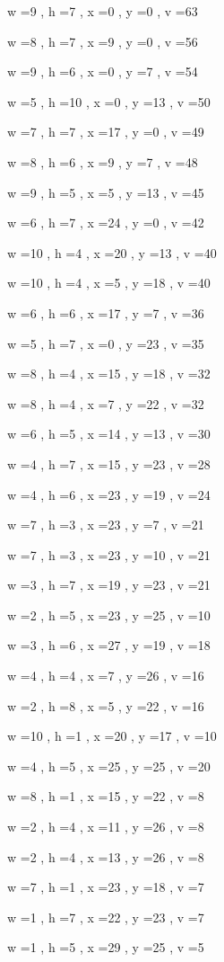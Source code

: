\documentclass[11pt]{article}
\begin{document}
w =9 , h =7 , x =0 , y =0 , v =63
\par
w =8 , h =7 , x =9 , y =0 , v =56
\par
w =9 , h =6 , x =0 , y =7 , v =54
\par
w =5 , h =10 , x =0 , y =13 , v =50
\par
w =7 , h =7 , x =17 , y =0 , v =49
\par
w =8 , h =6 , x =9 , y =7 , v =48
\par
w =9 , h =5 , x =5 , y =13 , v =45
\par
w =6 , h =7 , x =24 , y =0 , v =42
\par
w =10 , h =4 , x =20 , y =13 , v =40
\par
w =10 , h =4 , x =5 , y =18 , v =40
\par
w =6 , h =6 , x =17 , y =7 , v =36
\par
w =5 , h =7 , x =0 , y =23 , v =35
\par
w =8 , h =4 , x =15 , y =18 , v =32
\par
w =8 , h =4 , x =7 , y =22 , v =32
\par
w =6 , h =5 , x =14 , y =13 , v =30
\par
w =4 , h =7 , x =15 , y =23 , v =28
\par
w =4 , h =6 , x =23 , y =19 , v =24
\par
w =7 , h =3 , x =23 , y =7 , v =21
\par
w =7 , h =3 , x =23 , y =10 , v =21
\par
w =3 , h =7 , x =19 , y =23 , v =21
\par
w =2 , h =5 , x =23 , y =25 , v =10
\par
w =3 , h =6 , x =27 , y =19 , v =18
\par
w =4 , h =4 , x =7 , y =26 , v =16
\par
w =2 , h =8 , x =5 , y =22 , v =16
\par
w =10 , h =1 , x =20 , y =17 , v =10
\par
w =4 , h =5 , x =25 , y =25 , v =20
\par
w =8 , h =1 , x =15 , y =22 , v =8
\par
w =2 , h =4 , x =11 , y =26 , v =8
\par
w =2 , h =4 , x =13 , y =26 , v =8
\par
w =7 , h =1 , x =23 , y =18 , v =7
\par
w =1 , h =7 , x =22 , y =23 , v =7
\par
w =1 , h =5 , x =29 , y =25 , v =5
\par
\newpage
\end{document}
